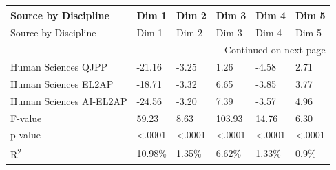 \begin{longtable}[c]{p{5.5cm}p{1.25cm}p{1.25cm}p{1.25cm}p{1.25cm}p{1.25cm}}
\toprule
Source by Discipline & Dim 1 & Dim 2 & Dim 3 & Dim 4 & Dim 5 \\
\midrule
\endfirsthead
\toprule
Source by Discipline & Dim 1 & Dim 2 & Dim 3 & Dim 4 & Dim 5 \\
\midrule
\endhead
\midrule
\multicolumn{6}{r}{Continued on next page} \\
\midrule
\endfoot
\bottomrule
\endlastfoot
Human Sciences QJPP & -21.16 & -3.25 & 1.26 & -4.58 & 2.71 \\
Human Sciences EL2AP & -18.71 & -3.32 & 6.65 & -3.85 & 3.77 \\
Human Sciences AI-EL2AP & -24.56 & -3.20 & 7.39 & -3.57 & 4.96 \\
\hline
F-value & 59.23 & 8.63 & 103.93 & 14.76 & 6.30 \\
p-value & <.0001 & <.0001 & <.0001 & <.0001 & <.0001 \\
R\textsuperscript{2} & 10.98\% & 1.35\% & 6.62\% & 1.33\% & 0.9\% \\
\end{longtable}
